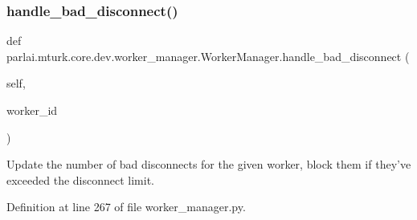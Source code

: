 \subsubsection{\texorpdfstring{handle\+\_\+bad\+\_\+disconnect()}{handle\_bad\_disconnect()}}
{\footnotesize\ttfamily def parlai.\+mturk.\+core.\+dev.\+worker\+\_\+manager.\+Worker\+Manager.\+handle\+\_\+bad\+\_\+disconnect (\begin{DoxyParamCaption}\item[{}]{self,  }\item[{}]{worker\+\_\+id }\end{DoxyParamCaption})}

\begin{DoxyVerb}Update the number of bad disconnects for the given worker, block them if they've
exceeded the disconnect limit.
\end{DoxyVerb}
 

Definition at line 267 of file worker\+\_\+manager.\+py.


